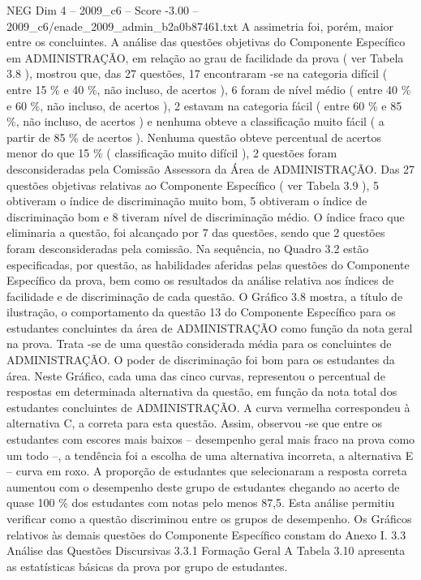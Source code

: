\begin{textsample}{NEG Dim 4 – 2009\_c6 – Score -3.00 – 2009\_c6/enade\_2009\_admin\_b2a0b87461.txt}
A assimetria foi, porém, maior entre os concluintes.
A análise das questões objetivas do Componente Específico em ADMINISTRAÇÃO, em relação ao grau de facilidade da prova ( ver Tabela 3.8 ), mostrou que, das 27 questões, 17 encontraram -se na categoria difícil ( entre 15 \% e 40 \%, não incluso, de acertos ), 6 foram de nível médio ( entre 40 \% e 60 \%, não incluso, de acertos ), 2 estavam na categoria fácil ( entre 60 \% e 85 \%, não incluso, de acertos ) e nenhuma obteve a classificação muito fácil ( a partir de 85 \% de acertos ).
Nenhuma questão obteve percentual de acertos menor do que 15 \% ( classificação muito difícil ), 2 questões foram desconsideradas pela Comissão Assessora da Área de ADMINISTRAÇÃO.
Das 27 questões objetivas relativas ao Componente Específico ( ver Tabela 3.9 ), 5 obtiveram o índice de discriminação muito bom, 5 obtiveram o índice de discriminação bom e 8 tiveram nível de discriminação médio.
O índice fraco que eliminaria a questão, foi alcançado por 7 das questões, sendo que 2 questões foram desconsideradas pela comissão.
Na sequência, no Quadro 3.2 estão especificadas, por questão, as habilidades aferidas pelas questões do Componente Específico da prova, bem como os resultados da análise relativa aos índices de facilidade e de discriminação de cada questão.
O Gráfico 3.8 mostra, a título de ilustração, o comportamento da questão 13 do Componente Específico para os estudantes concluintes da área de ADMINISTRAÇÃO como função da nota geral na prova.
Trata -se de uma questão considerada média para os concluintes de ADMINISTRAÇÃO.
O poder de discriminação foi bom para os estudantes da área.
Neste Gráfico, cada uma das cinco curvas, representou o percentual de respostas em determinada alternativa da questão, em função da nota total dos estudantes concluintes de ADMINISTRAÇÃO.
A curva vermelha correspondeu à alternativa C, a correta para esta questão.
Assim, observou -se que entre os estudantes com escores mais baixos – desempenho geral mais fraco na prova como um todo –, a tendência foi a escolha de uma alternativa incorreta, a alternativa E – curva em roxo.
A proporção de estudantes que selecionaram a resposta correta aumentou com o desempenho deste grupo de estudantes chegando ao acerto de quase 100 \% dos estudantes com notas pelo menos 87,5.
Esta análise permitiu verificar como a questão discriminou entre os grupos de desempenho.
Os Gráficos relativos às demais questões do Componente Específico constam do Anexo I. 3.3 Análise das Questões Discursivas 3.3.1 Formação Geral A Tabela 3.10 apresenta as estatísticas básicas da prova por grupo de estudantes.

\end{textsample}
